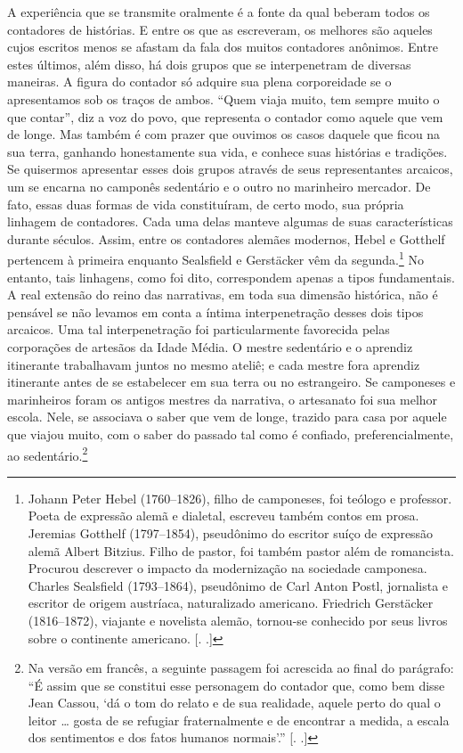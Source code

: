 A experiência que se transmite oralmente é a fonte da qual beberam todos
os contadores de histórias. E entre os que as escreveram, os melhores
são aqueles cujos escritos menos se afastam da fala dos muitos
contadores anônimos. Entre estes últimos, além disso, há dois grupos que
se interpenetram de diversas maneiras. A figura do contador só adquire
sua plena corporeidade se o apresentamos sob os traços de ambos. ``Quem
viaja muito, tem sempre muito o que contar'', diz a voz do povo, que
representa o contador como aquele que vem de longe. Mas também é com
prazer que ouvimos os casos daquele que ficou na sua terra, ganhando
honestamente sua vida, e conhece suas histórias e tradições. Se
quisermos apresentar esses dois grupos através de seus representantes
arcaicos, um se encarna no camponês sedentário e o outro no marinheiro
mercador. De fato, essas duas formas de vida constituíram, de certo
modo, sua própria linhagem de contadores. Cada uma delas manteve algumas
de suas características durante séculos. Assim, entre os contadores
alemães modernos, Hebel e Gotthelf pertencem à primeira enquanto
Sealsfield e Gerstäcker vêm da segunda.\footnote{Johann Peter Hebel
  (1760--1826), filho de camponeses, foi teólogo e professor. Poeta de
  expressão alemã e dialetal, escreveu também contos em prosa. Jeremias
  Gotthelf (1797--1854), pseudônimo do escritor suíço de expressão alemã
  Albert Bitzius. Filho de pastor, foi também pastor além de romancista.
  Procurou descrever o impacto da modernização na sociedade camponesa.
  Charles Sealsfield (1793--1864), pseudônimo de Carl Anton Postl,
  jornalista e escritor de origem austríaca, naturalizado americano.
  Friedrich Gerstäcker (1816--1872), viajante e novelista alemão,
  tornou-se conhecido por seus livros sobre o continente americano.
  [. .]} No entanto, tais linhagens, como foi dito,
correspondem apenas a tipos fundamentais. A real extensão do reino das
narrativas, em toda sua dimensão histórica, não é pensável se não
levamos em conta a íntima interpenetração desses dois tipos arcaicos.
Uma tal interpenetração foi particularmente favorecida pelas corporações
de artesãos da Idade Média. O mestre sedentário e o aprendiz itinerante
trabalhavam juntos no mesmo ateliê; e cada mestre fora aprendiz itinerante
antes de se estabelecer em sua terra ou no estrangeiro. Se camponeses e
marinheiros foram os antigos mestres da narrativa, o artesanato foi sua
melhor escola. Nele, se associava o saber que vem de longe, trazido para
casa por aquele que viajou muito, com o saber do passado tal como 
é confiado, preferencialmente, ao sedentário.\footnote{Na versão em
  francês, a seguinte passagem foi acrescida ao final do parágrafo: ``É
  assim que se constitui esse personagem do contador que, como bem disse
  Jean Cassou, `dá o tom do relato e de sua realidade, aquele perto do
  qual o leitor \ldots{} gosta de se refugiar fraternalmente e de
  encontrar a medida, a escala dos sentimentos e dos fatos humanos
  normais'.'' [. .]}

